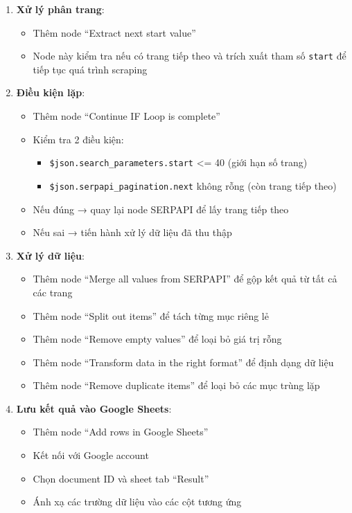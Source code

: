 \begin{enumerate}
  \item \textbf{Xử lý phân trang}:
  \begin{itemize}
    \item Thêm node ``Extract next start value''
    \item Node này kiểm tra nếu có trang tiếp theo và trích xuất tham số \texttt{start} để tiếp tục quá trình scraping
  \end{itemize}

  \item \textbf{Điều kiện lặp}:
  \begin{itemize}
    \item Thêm node ``Continue IF Loop is complete''
    \item Kiểm tra 2 điều kiện:
    \begin{itemize}
      \item \texttt{\$json.search\_parameters.start} <= 40 (giới hạn số trang)
      \item \texttt{\$json.serpapi\_pagination.next} không rỗng (còn trang tiếp theo)
    \end{itemize}
    \item Nếu đúng → quay lại node SERPAPI để lấy trang tiếp theo
    \item Nếu sai → tiến hành xử lý dữ liệu đã thu thập
  \end{itemize}

  \item \textbf{Xử lý dữ liệu}:
  \begin{itemize}
    \item Thêm node ``Merge all values from SERPAPI'' để gộp kết quả từ tất cả các trang
    \item Thêm node ``Split out items'' để tách từng mục riêng lẻ
    \item Thêm node ``Remove empty values'' để loại bỏ giá trị rỗng
    \item Thêm node ``Transform data in the right format'' để định dạng dữ liệu
    \item Thêm node ``Remove duplicate items'' để loại bỏ các mục trùng lặp
  \end{itemize}

  \item \textbf{Lưu kết quả vào Google Sheets}:
  \begin{itemize}
    \item Thêm node ``Add rows in Google Sheets''
    \item Kết nối với Google account
    \item Chọn document ID và sheet tab ``Result''
    \item Ánh xạ các trường dữ liệu vào các cột tương ứng
  \end{itemize}


\end{enumerate}
